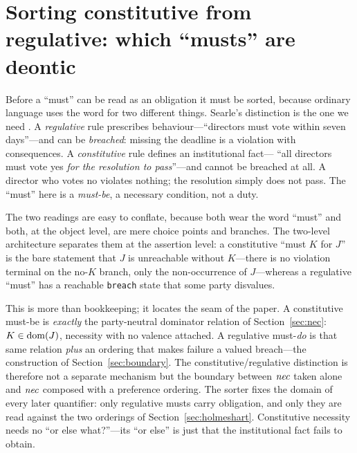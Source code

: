 \section{Sorting constitutive from regulative: which ``musts'' are deontic}
\label{sec:sorter}

Before a ``must'' can be read as an obligation it must be sorted, because ordinary language
uses the word for two different things. Searle's distinction is the one we need
. A \emph{regulative} rule prescribes behaviour---``directors
must vote within seven days''---and can be \emph{breached}: missing the deadline is a
violation with consequences. A \emph{constitutive} rule defines an institutional fact---
``all directors must vote yes \emph{for the resolution to pass}''---and cannot be breached
at all. A director who votes no violates nothing; the resolution simply does not pass. The
``must'' here is a \emph{must-be}, a necessary condition, not a duty.

The two readings are easy to conflate, because both wear the word ``must'' and both, at the
object level, are mere choice points and branches. The two-level architecture separates
them at the assertion level: a constitutive ``must $K$ for $J$'' is the bare statement that
$J$ is unreachable without $K$---there is no violation terminal on the no-$K$ branch, only
the non-occurrence of $J$---whereas a regulative ``must'' has a reachable \texttt{breach}
state that some party disvalues.

This is more than bookkeeping; it locates the seam of the paper. A constitutive must-be is
\emph{exactly} the party-neutral dominator relation of Section~\ref{sec:nec}:
$K\in\operatorname{dom}(J)$, necessity with no valence attached. A regulative must-\emph{do} is that same
relation \emph{plus} an ordering that makes failure a valued breach---the construction of
Section~\ref{sec:boundary}. The constitutive/regulative distinction is therefore not a
separate mechanism but the boundary between $\mathit{nec}$ taken alone and $\mathit{nec}$ composed with a
preference ordering. The sorter fixes the domain of every later quantifier: only regulative
musts carry obligation, and only they are read against the two orderings of
Section~\ref{sec:holmeshart}. Constitutive necessity needs no ``or else what?''---its ``or
else'' is just that the institutional fact fails to obtain.
